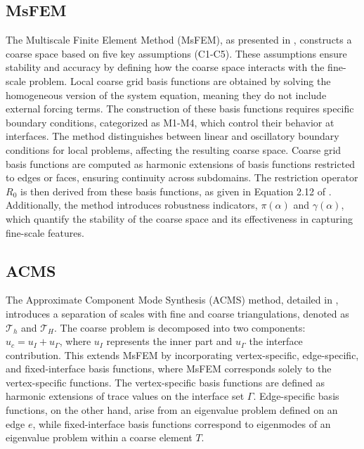 \subsection{MsFEM} 
The Multiscale Finite Element Method (MsFEM), as presented in \cite{msfem_coarse_space_Graham_2007}, constructs a coarse space based on five key assumptions (C1-C5). These assumptions ensure stability and accuracy by defining how the coarse space interacts with the fine-scale problem. Local coarse grid basis functions are obtained by solving the homogeneous version of the system equation, meaning they do not include external forcing terms. The construction of these basis functions requires specific boundary conditions, categorized as M1-M4, which control their behavior at interfaces. The method distinguishes between linear and oscillatory boundary conditions for local problems, affecting the resulting coarse space. Coarse grid basis functions are computed as harmonic extensions of basis functions restricted to edges or faces, ensuring continuity across subdomains. The restriction operator $R_0$ is then derived from these basis functions, as given in Equation 2.12 of \cite{msfem_coarse_space_Graham_2007}. Additionally, the method introduces robustness indicators, $\pi(\alpha)$ and $\gamma(\alpha)$, which quantify the stability of the coarse space and its effectiveness in capturing fine-scale features.
 
\subsection{ACMS}
The Approximate Component Mode Synthesis (ACMS) method, detailed in \cite{acms_coarse_space_Heinlein2018}, introduces a separation of scales with fine and coarse triangulations, denoted as $\mathcal{T}_h$ and $\mathcal{T}_H$. The coarse problem is decomposed into two components: $u_c = u_I + u_{\Gamma}$, where $u_I$ represents the inner part and $u_{\Gamma}$ the interface contribution. This extends MsFEM by incorporating vertex-specific, edge-specific, and fixed-interface basis functions, where MsFEM corresponds solely to the vertex-specific functions. The vertex-specific basis functions are defined as harmonic extensions of trace values on the interface set $\Gamma$. Edge-specific basis functions, on the other hand, arise from an eigenvalue problem defined on an edge $e$, while fixed-interface basis functions correspond to eigenmodes of an eigenvalue problem within a coarse element $T$.
    
